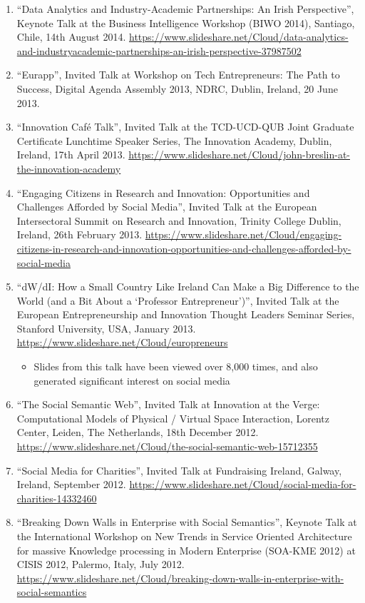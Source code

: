 \documentclass[10pt,a4paper]{res} %
\begin{document}
\begin{resume}
\begin{enumerate}
\item ``Data Analytics and Industry-Academic Partnerships: An Irish Perspective'', Keynote Talk at the Business Intelligence Workshop (BIWO 2014), Santiago, Chile, 14th August 2014. \url{https://www.slideshare.net/Cloud/data-analytics-and-industryacademic-partnerships-an-irish-perspective-37987502}
\item ``Eurapp'', Invited Talk at Workshop on Tech Entrepreneurs: The Path to Success, Digital Agenda Assembly 2013, NDRC, Dublin, Ireland, 20 June 2013.
\item ``Innovation Caf\'{e} Talk'', Invited Talk at the TCD-UCD-QUB Joint Graduate Certificate Lunchtime Speaker Series, The Innovation Academy, Dublin, Ireland, 17th April 2013. \url{https://www.slideshare.net/Cloud/john-breslin-at-the-innovation-academy}
\item ``Engaging Citizens in Research and Innovation: Opportunities and Challenges Afforded by Social Media'', Invited Talk at the European Intersectoral Summit on Research and Innovation, Trinity College Dublin, Ireland, 26th February 2013. \url{https://www.slideshare.net/Cloud/engaging-citizens-in-research-and-innovation-opportunities-and-challenges-afforded-by-social-media}
\item ``dW/dI: How a Small Country Like Ireland Can Make a Big Difference to the World (and a Bit About a `Professor Entrepreneur')'', Invited Talk at the European Entrepreneurship and Innovation Thought Leaders Seminar Series, Stanford University, USA, January 2013. \url{https://www.slideshare.net/Cloud/europreneurs}
\begin{itemize} \itemsep -2pt
\item Slides from this talk have been viewed over 8,000 times, and also generated significant interest on social media
\end{itemize}
\item ``The Social Semantic Web'', Invited Talk at Innovation at the Verge: Computational Models of Physical / Virtual Space Interaction, Lorentz Center, Leiden, The Netherlands, 18th December 2012. \url{https://www.slideshare.net/Cloud/the-social-semantic-web-15712355}
\item ``Social Media for Charities'', Invited Talk at Fundraising Ireland, Galway, Ireland, September 2012. \url{https://www.slideshare.net/Cloud/social-media-for-charities-14332460}
\item ``Breaking Down Walls in Enterprise with Social Semantics'', Keynote Talk at the International Workshop on New Trends in Service Oriented Architecture for massive Knowledge processing in Modern Enterprise (SOA-KME 2012) at CISIS 2012, Palermo, Italy, July 2012. \url{https://www.slideshare.net/Cloud/breaking-down-walls-in-enterprise-with-social-semantics}

\end{enumerate}
\end{resume}
\end{document}

